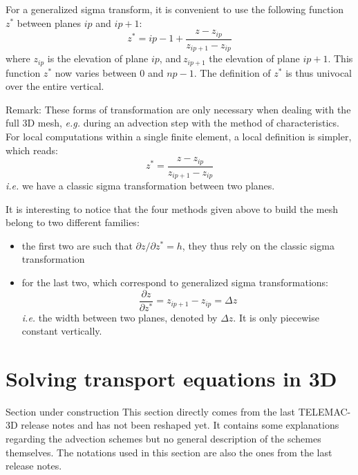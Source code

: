 For a generalized sigma transform, it is convenient to use the following
function $z^{\ast}$ between planes $ip$ and $ip+1$:%
\begin{equation}
z^{\ast}=ip-1+\dfrac{z-z_{ip}}{z_{ip+1}-z_{ip}}%
\end{equation}
where $z_{ip}$ is the elevation of plane $ip$, and$\ z_{ip+1}$ the elevation
of plane $ip+1$. This function $z^{\ast}$ now varies between 0 and $np-1$.
The definition of $z^{\ast}$ is thus univocal over the entire vertical.

\begin{CommentBlock}{Remark:}
These forms of transformation are only necessary when dealing with the full 3D
mesh, \textit{e.g.} during an advection step with the method of characteristics.
For local computations within a single finite element, a local definition is simpler, which reads:
\begin{equation}
z^{\ast}=\dfrac{z-z_{ip}}{z_{ip+1}-z_{ip}}
\end{equation}
\textit{i.e.} we have a classic sigma transformation between two planes.
\end{CommentBlock}

It is interesting to notice that the four methods given above to build the mesh
belong to two different families:
\begin{itemize}
\item the first two are such that $\partial z/\partial z^{\ast}=h$, they thus rely on the classic sigma transformation
\item for the last two, which correspond to generalized sigma transformations:
\begin{equation}
\dfrac{\partial z}{\partial z^{\ast}}=z_{ip+1}-z_{ip}=\Delta z
\end{equation}
\textit{i.e.} the width between two planes, denoted by $\Delta z$. It is only
piecewise constant vertically.
\end{itemize}


\section{\label{equations de transport}Solving transport equations in 3D
%
}

\begin{WarningBlock}{Section under construction}
This section directly comes from the last TELEMAC-3D release notes and has not been
reshaped yet. It contains some explanations regarding the advection schemes but
no general description of the schemes themselves. The notations used in this
section are also the ones from the last release notes.
\end{WarningBlock}

